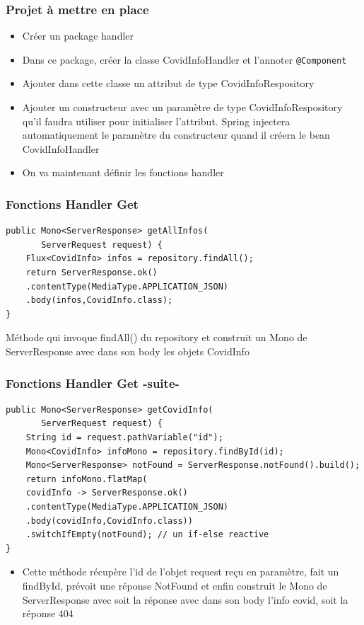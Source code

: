 \documentclass{beamer}
\begin{document}
\begin{frame}[fragile]
	\frametitle{Projet à mettre en place}
	\begin{itemize}
		\item Créer un package handler
		\item Dans ce package, créer la classe CovidInfoHandler et l'annoter \texttt{@Component}
		\item Ajouter dans cette classe un attribut de type CovidInfoRespository
		\item Ajouter un constructeur avec un paramètre de type CovidInfoRespository qu'il faudra utiliser pour initialiser l'attribut. Spring injectera automatiquement le paramètre du constructeur quand il créera le bean CovidInfoHandler
		\item On va maintenant définir les fonctions handler
	\end{itemize}
\end{frame}

\begin{frame}[fragile]
	\frametitle{Fonctions Handler Get}
\begin{lstlisting}
public Mono<ServerResponse> getAllInfos(
       ServerRequest request) {
	Flux<CovidInfo> infos = repository.findAll();
	return ServerResponse.ok()
	.contentType(MediaType.APPLICATION_JSON)
	.body(infos,CovidInfo.class);
}
\end{lstlisting}
Méthode qui invoque findAll() du repository et construit un Mono de ServerResponse avec dans son body les objets CovidInfo
\end{frame}

\begin{frame}[fragile]
\frametitle{Fonctions Handler Get -suite-}
\begin{lstlisting}
public Mono<ServerResponse> getCovidInfo(
       ServerRequest request) {
	String id = request.pathVariable("id");
	Mono<CovidInfo> infoMono = repository.findById(id);
	Mono<ServerResponse> notFound = ServerResponse.notFound().build();	
	return infoMono.flatMap(
	covidInfo -> ServerResponse.ok()
	.contentType(MediaType.APPLICATION_JSON)
	.body(covidInfo,CovidInfo.class))
	.switchIfEmpty(notFound); // un if-else reactive
}
\end{lstlisting}
	\begin{itemize}
		\item Cette méthode récupère l'id de l'objet request reçu en paramètre, fait un findById, prévoit une réponse NotFound et enfin construit le Mono de ServerResponse avec soit la réponse avec dans son body l'info covid, soit la réponse 404
	\end{itemize}
\end{frame}
\end{document}
